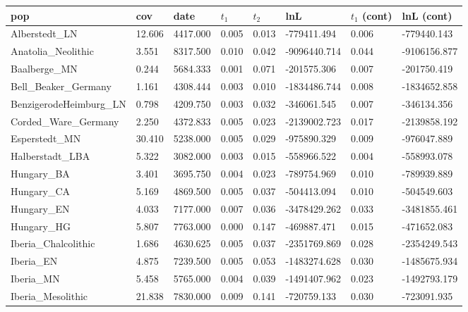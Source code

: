 \documentclass[11pt, oneside]{article}   	%
\begin{document}
\begin{table}[!p]
\centering
\begin{tabular}{llllllll}
pop                     & cov    & date     & $t_1$ & $t_2$ & lnL          & $t_1$ (cont) & lnL (cont)  \\ \hline
Alberstedt\_LN          & 12.606 & 4417.000 & 0.005 & 0.013 & -779411.494  & 0.006       & -779440.143  \\
Anatolia\_Neolithic     & 3.551  & 8317.500 & 0.010 & 0.042 & -9096440.714 & 0.044       & -9106156.877 \\
Baalberge\_MN           & 0.244  & 5684.333 & 0.001 & 0.071 & -201575.306  & 0.007       & -201750.419  \\
Bell\_Beaker\_Germany   & 1.161  & 4308.444 & 0.003 & 0.010 & -1834486.744 & 0.008       & -1834652.858 \\
BenzigerodeHeimburg\_LN & 0.798  & 4209.750 & 0.003 & 0.032 & -346061.545  & 0.007       & -346134.356  \\
Corded\_Ware\_Germany   & 2.250  & 4372.833 & 0.005 & 0.023 & -2139002.723 & 0.017       & -2139858.192 \\
Esperstedt\_MN          & 30.410 & 5238.000 & 0.005 & 0.029 & -975890.329  & 0.009       & -976047.889  \\
Halberstadt\_LBA        & 5.322  & 3082.000 & 0.003 & 0.015 & -558966.522  & 0.004       & -558993.078  \\
Hungary\_BA             & 3.401  & 3695.750 & 0.004 & 0.023 & -789754.969  & 0.010       & -789939.889  \\
Hungary\_CA             & 5.169  & 4869.500 & 0.005 & 0.037 & -504413.094  & 0.010       & -504549.603  \\
Hungary\_EN             & 4.033  & 7177.000 & 0.007 & 0.036 & -3478429.262 & 0.033       & -3481855.461 \\
Hungary\_HG             & 5.807  & 7763.000 & 0.000 & 0.147 & -469887.471  & 0.015       & -471652.083  \\
Iberia\_Chalcolithic    & 1.686  & 4630.625 & 0.005 & 0.037 & -2351769.869 & 0.028       & -2354249.543 \\
Iberia\_EN              & 4.875  & 7239.500 & 0.005 & 0.053 & -1483274.628 & 0.030       & -1485675.934 \\
Iberia\_MN              & 5.458  & 5765.000 & 0.004 & 0.039 & -1491407.962 & 0.023       & -1492793.179 \\
Iberia\_Mesolithic      & 21.838 & 7830.000 & 0.009 & 0.141 & -720759.133  & 0.030       & -723091.935  \\

\end{tabular}
\end{table}
\end{document}
